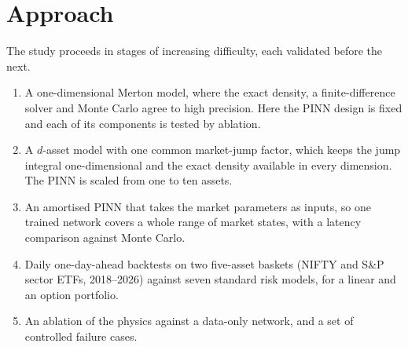 \section{Approach}
The study proceeds in stages of increasing difficulty, each validated before the next.
\begin{enumerate}
  \item A one-dimensional Merton model, where the exact density, a finite-difference solver and Monte Carlo
    agree to high precision. Here the PINN design is fixed and each of its components is tested by ablation.
  \item A $d$-asset model with one common market-jump factor, which keeps the jump integral one-dimensional and
    the exact density available in every dimension. The PINN is scaled from one to ten assets.
  \item An amortised PINN that takes the market parameters as inputs, so one trained network covers a whole
    range of market states, with a latency comparison against Monte Carlo.
  \item Daily one-day-ahead backtests on two five-asset baskets (NIFTY and S\&P sector ETFs, 2018--2026) against
    seven standard risk models, for a linear and an option portfolio.
  \item An ablation of the physics against a data-only network, and a set of controlled failure cases.
\end{enumerate}

